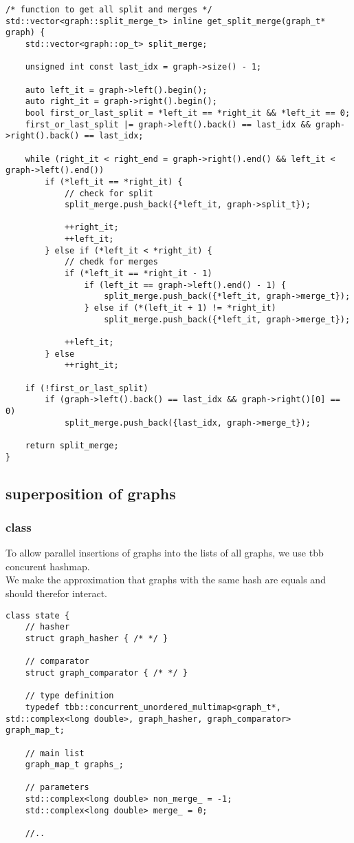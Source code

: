 \documentclass[11pt]{article}
\begin{document}
\begin{lstlisting}[style=CStyle]
/* function to get all split and merges */
std::vector<graph::split_merge_t> inline get_split_merge(graph_t* graph) {
	std::vector<graph::op_t> split_merge;

	unsigned int const last_idx = graph->size() - 1;

	auto left_it = graph->left().begin();
	auto right_it = graph->right().begin();
	bool first_or_last_split = *left_it == *right_it && *left_it == 0;
	first_or_last_split |= graph->left().back() == last_idx && graph->right().back() == last_idx;

	while (right_it < right_end = graph->right().end() && left_it < graph->left().end())
		if (*left_it == *right_it) {
			// check for split
			split_merge.push_back({*left_it, graph->split_t});

			++right_it;
			++left_it;
		} else if (*left_it < *right_it) {
			// chedk for merges
			if (*left_it == *right_it - 1)
				if (left_it == graph->left().end() - 1) {
					split_merge.push_back({*left_it, graph->merge_t});
				} else if (*(left_it + 1) != *right_it)
					split_merge.push_back({*left_it, graph->merge_t});

			++left_it;
		} else
			++right_it;
		
	if (!first_or_last_split)
		if (graph->left().back() == last_idx && graph->right()[0] == 0)
			split_merge.push_back({last_idx, graph->merge_t});

	return split_merge;
}
\end{lstlisting}

\subsection{superposition of graphs}

\subsubsection{class}

To allow parallel insertions of graphs into the lists of all graphs, we use tbb concurent hashmap. \\

We make the approximation that graphs with the same hash are equals and should therefor interact.

\begin{lstlisting}[style=CStyle]
class state {
	// hasher
	struct graph_hasher { /* */ }

	// comparator
	struct graph_comparator { /* */ }

	// type definition
	typedef tbb::concurrent_unordered_multimap<graph_t*, std::complex<long double>, graph_hasher, graph_comparator> graph_map_t;

	// main list 
	graph_map_t graphs_;

	// parameters
	std::complex<long double> non_merge_ = -1;
	std::complex<long double> merge_ = 0;
	
	//..
\end{lstlisting}
\end{document}
